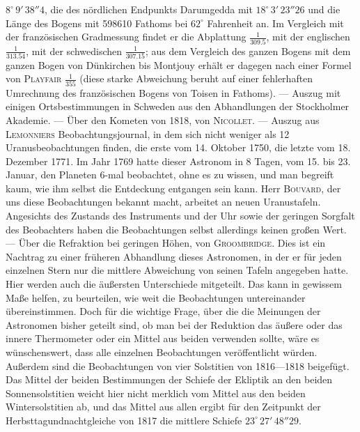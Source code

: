 $8^\circ\,9'\,38''4$, die des nördlichen Endpunkts Darumgedda mit $18^\circ\,3'\,23''26$ und die Länge des Bogens mit 598610 Fathoms bei $62^\circ$ Fahrenheit an. Im Vergleich mit der französischen Gradmessung findet er die Abplattung $\frac{1}{309.5}$, mit der englischen $\frac{1}{313.54}$, mit der schwedischen $\frac{1}{307.15}$; aus dem Vergleich des ganzen Bogens mit dem ganzen Bogen von Dünkirchen bis Montjouy erhält er dagegen nach einer Formel von \textsc{Playfair} $\frac{1}{355}$ (diese starke Abweichung beruht auf einer fehlerhaften Umrechnung des französischen Bogens von Toisen in Fathoms). --- Auszug mit einigen Ortsbestimmungen in Schweden aus den Abhandlungen der Stockholmer Akademie. --- Über den Kometen von 1818, von \textsc{Nicollet}. --- Auszug aus \textsc{Lemonniers} Beobachtungsjournal, in dem sich nicht weniger als 12 Uranusbeobachtungen finden, die erste vom 14. Oktober 1750, die letzte vom 18. Dezember 1771. Im Jahr 1769 hatte dieser Astronom in 8 Tagen, vom 15. bis 23. Januar, den Planeten 6-mal beobachtet, ohne es zu wissen, und man begreift kaum, wie ihm selbst die Entdeckung entgangen sein kann. Herr \textsc{Bouvard}, der uns diese Beobachtungen bekannt macht, arbeitet an neuen Uranustafeln. Angesichts des Zustands des Instruments und der Uhr sowie der geringen Sorgfalt des Beobachters haben die Beobachtungen selbst allerdings keinen großen Wert. --- Über die Refraktion bei geringen Höhen, von \textsc{Groombridge}. Dies ist ein Nachtrag zu einer früheren Abhandlung dieses Astronomen, in der er für jeden einzelnen Stern nur die mittlere Abweichung von seinen Tafeln angegeben hatte. Hier werden auch die äußersten Unterschiede mitgeteilt. Das kann in gewissem Maße helfen, zu beurteilen, wie weit die Beobachtungen untereinander übereinstimmen. Doch für die wichtige Frage, über die die Meinungen der Astronomen bisher geteilt sind, ob man bei der Reduktion das äußere oder das innere Thermometer oder ein Mittel aus beiden verwenden sollte, wäre es wünschenswert, dass alle einzelnen Beobachtungen veröffentlicht würden. Außerdem sind die Beobachtungen von vier Solstitien von 1816---1818 beigefügt. Das Mittel der beiden Bestimmungen der Schiefe der Ekliptik an den beiden Sonnensolstitien weicht hier nicht merklich vom Mittel aus den beiden Wintersolstitien ab, und das Mittel aus allen ergibt für den Zeitpunkt der Herbsttagundnachtgleiche von 1817 die mittlere Schiefe $23^\circ\,27'\,48''29$.
\par\clearpage\endgroup
